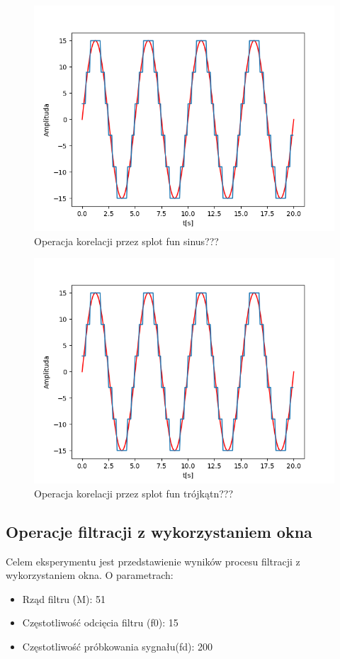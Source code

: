 \documentclass[12pt]{article}
\begin{document}
\begin{figure}[H]
\centering
\includegraphics[scale=0.6]{1sinusKwantStopien5.png}
\caption{Operacja korelacji przez splot fun sinus???}
\end{figure}

\begin{figure}[H]
\centering
\includegraphics[scale=0.6]{1sinusKwantStopien5.png}
\caption{Operacja korelacji przez splot fun trójkątn???}
\end{figure}

\subsection{Operacje filtracji z wykorzystaniem okna}
Celem eksperymentu jest przedstawienie wyników procesu filtracji z wykorzystaniem okna. O parametrach:
\begin{itemize}
\item Rząd filtru (M): 51
\item Częstotliwość odcięcia filtru (f0): 15
\item Częstotliwość próbkowania sygnału(fd): 200
\end{itemize}
\end{document}
